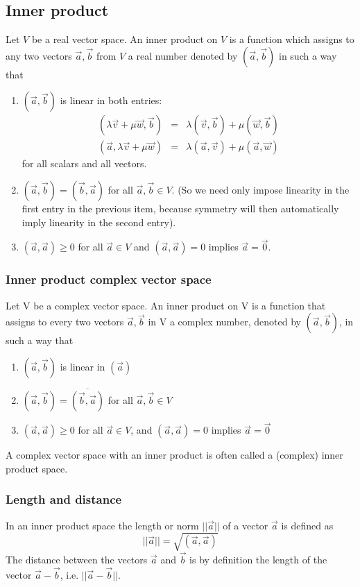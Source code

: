 \documentclass{article}
\begin{document}
		\subsection{Inner product}
		Let $V$ be a real vector space. An inner product on $V$ is a function which assigns to any two vectors $\vec{a},\vec{b}$ from $V$ a real number denoted by $(\vec{a},\vec{b})$ in such a way that
		\begin{enumerate}
			\item $(\vec{a}, \vec{b})$ is linear in both entries:
			\begin{eqnarray*}
				(\lambda\vec{v} + \mu\vec{w}, \vec{b}) &=& \lambda(\vec{v}, \vec{b}) + \mu(\vec{w}, \vec{b})\\
				(\vec{a}, \lambda\vec{v}+\mu\vec{w}) &=& \lambda(\vec{a}, \vec{v}) + \mu(\vec{a}, \vec{w})				
			\end{eqnarray*}
			for all scalars and all vectors.
			\item $(\vec{a}, \vec{b}) = (\vec{b}, \vec{a})$ for all $\vec{a},\vec{b} \in V$. (So we need only impose linearity in the first entry in the previous item, because symmetry will then automatically imply linearity in the second entry).
			\item $(\vec{a}, \vec{a}) \ge 0$ for all $\vec{a}\in V$ and $(\vec{a}, \vec{a}) = 0$ implies $\vec{a} = \vec{0}$.
		\end{enumerate}

		\subsubsection{Inner product complex vector space}
		Let V be a complex vector space. An inner product on V is a function that assigns to every two vectors $\vec{a}, \vec{b}$ in V a complex number, denoted by $(\vec{a}, \vec{b})$, in such a way that
		\begin{enumerate}
			\item $(\vec{a}, \vec{b})$ is linear in $(\vec{a})$
			\item $(\vec{a},\vec{b}) = \overline{(\vec{b}, \vec{a})}$ for all $\vec{a},\vec{b} \in V$
			\item $(\vec{a}, \vec{a}) \ge 0$ for all $\vec{a} \in V$, and $(\vec{a},\vec{a})=0$ implies $\vec{a} = \vec{0}$
		\end{enumerate}
		A complex vector space with an inner product is often called a (complex) inner product space.
			
		\subsubsection{Length and distance}
		In an inner product space the length or norm $||\vec{a}||$ of a vector $\vec{a}$ is defined as 
		\begin{equation*}
			||\vec{a}|| = \sqrt{(\vec{a}, \vec{a})}
		\end{equation*}
		The distance between the vectors $\vec{a}$ and $\vec{b}$ is by definition the length of the vector $\vec{a} - \vec{b}$, i.e. $||\vec{a}-\vec{b}||$.
		
\end{document}
